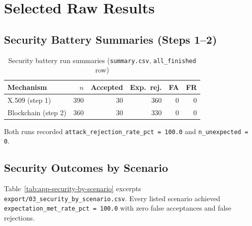 \section{Selected Raw Results}
\label{app:selected-raw}

\subsection{Security Battery Summaries (Steps 1--2)}
\label{app:raw-security}

\begin{table}[htbp]
    \centering
    \caption{Security battery run summaries (\texttt{summary.csv}, \texttt{all\_finished} row)}
    \label{tab:app-raw-security}
    \small
    \begin{tabular}{|l|r|r|r|r|r|}
        \hline
        \textbf{Mechanism} & \textbf{$n$} & \textbf{Accepted} & \textbf{Exp.\ rej.} & \textbf{FA} & \textbf{FR} \\
        \hline
        X.509 (step 1) & 390 & 30 & 360 & 0 & 0 \\
        \hline
        Blockchain (step 2) & 360 & 30 & 330 & 0 & 0 \\
        \hline
    \end{tabular}
\end{table}

\noindent
Both runs recorded \texttt{attack\_rejection\_rate\_pct = 100.0} and \texttt{n\_unexpected = 0}.

\subsection{Security Outcomes by Scenario}
\label{app:raw-security-scenario}

Table~\ref{tab:app-security-by-scenario} excerpts \texttt{export/03\_security\_by\_scenario.csv}. Every listed scenario achieved \texttt{expectation\_met\_rate\_pct = 100.0} with zero false acceptances and false rejections.

